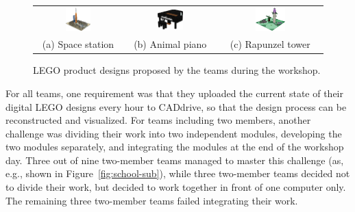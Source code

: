 \documentclass{PDS}
\begin{document}
\begin{figure}[htbp]
    \begin{center}
        \begin{tabular}{ccc}
            \includegraphics[width=0.305\textwidth]{./figures/space.png} &
            \includegraphics[width=0.305\textwidth]{./figures/piano.png} &
            \includegraphics[width=0.305\textwidth]{./figures/rapunzel.png} \\
            (a) Space station &
            (b) Animal piano &
            (c) Rapunzel tower
        \end{tabular}
    \end{center}
    \caption{LEGO product designs proposed by the teams during the workshop.}
    \label{fig:kinderuni}
\end{figure}

For all teams, one requirement was that they uploaded the current state of their digital LEGO designs every hour to CADdrive, so that the design process can be reconstructed and visualized.
For teams including two members, another challenge was dividing their work into two independent modules, developing the two modules separately, and integrating the modules at the end of the workshop day.
Three out of nine two-member teams managed to master this challenge (as, e.g., shown in Figure~\ref{fig:school-sub}), while three two-member teams decided not to divide their work, but decided to work together in front of one computer only.
The remaining three two-member teams failed integrating their work.
\end{document}
